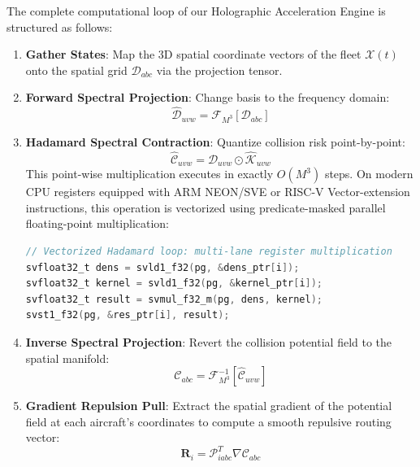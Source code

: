\documentclass[11pt,a4paper]{book}
\begin{document}
The complete computational loop of our Holographic Acceleration Engine is structured as follows:
\begin{enumerate}
\item \textbf{Gather States}: Map the 3D spatial coordinate vectors of the fleet $\mathcal{X}(t)$ onto the spatial grid $\mathcal{D}_{abc}$ via the projection tensor.
\item \textbf{Forward Spectral Projection}: Change basis to the frequency domain:
\begin{equation}
\widehat{\mathcal{D}}_{uvw} = \mathcal{F}_{M^3} [ \mathcal{D}_{abc} ]
\end{equation}
\item \textbf{Hadamard Spectral Contraction}: Quantize collision risk point-by-point:
\begin{equation}
\widehat{\mathcal{C}}_{uvw} = \widehat{\mathcal{D}}_{uvw} \odot \widehat{\mathcal{K}}_{uvw}
\end{equation}
This point-wise multiplication executes in exactly $O(M^3)$ steps. On modern CPU registers equipped with ARM NEON/SVE or RISC-V Vector-extension instructions, this operation is vectorized using predicate-masked parallel floating-point multiplication:
\begin{lstlisting}[language=C, caption={Vectorized Spectral Contraction on AArch64 SVE}]
// Vectorized Hadamard loop: multi-lane register multiplication
svfloat32_t dens = svld1_f32(pg, &dens_ptr[i]);
svfloat32_t kernel = svld1_f32(pg, &kernel_ptr[i]);
svfloat32_t result = svmul_f32_m(pg, dens, kernel);
svst1_f32(pg, &res_ptr[i], result);
\end{lstlisting}
\item \textbf{Inverse Spectral Projection}: Revert the collision potential field to the spatial manifold:
\begin{equation}
\mathcal{C}_{abc} = \mathcal{F}^{-1}_{M^3} [ \widehat{\mathcal{C}}_{uvw} ]
\end{equation}
\item \textbf{Gradient Repulsion Pull}: Extract the spatial gradient of the potential field at each aircraft's coordinates to compute a smooth repulsive routing vector:
\begin{equation}
\mathbf{R}_i = \mathcal{P}^T_{iabc} \nabla \mathcal{C}_{abc}
\end{equation}
\end{enumerate}
\end{document}
